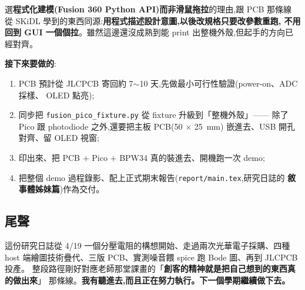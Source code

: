 \documentclass[12pt,a4paper]{article}
\begin{document}
選\textbf{程式化建模(Fusion 360 Python API)而非滑鼠拖拉}的理由,跟 PCB 那條線
從 SKiDL 學到的東西同源:\textbf{用程式描述設計意圖,以後改規格只要改參數重跑,
不用回到 GUI 一個個拉}。雖然這邊還沒成熟到能 print 出整機外殼,但起手的方向已經對齊。

\textbf{接下來要做的}:

\begin{enumerate}[leftmargin=2em,itemsep=0pt]
  \item PCB 預計從 JLCPCB 寄回約 7\(\sim\)10 天,先做最小可行性驗證(power-on、ADC 採樣、
        OLED 點亮);
  \item 同步把 \texttt{fusion\_pico\_fixture.py} 從 fixture 升級到「整機外殼」——
        除了 Pico 跟 photodiode 之外,還要把主板 PCB(50 \(\times\) \SI{25}{\milli\meter})
        嵌進去、USB 開孔對齊、留 OLED 視窗;
  \item 印出來、把 PCB \(+\) Pico \(+\) BPW34 真的裝進去、開機跑一次 demo;
  \item 把整個 demo 過程錄影、配上正式期末報告(\texttt{report/main.tex},研究日誌的
        \textbf{敘事體姊妹篇})作為交付。
\end{enumerate}

\subsection*{尾聲}

這份研究日誌從 4/19 一個分壓電阻的構想開始、走過兩次光華電子採購、四種 host
端繪圖技術疊代、三版 PCB、實測噪音餵 spice 跑 Bode 圖、再到 JLCPCB 投產。
整段路徑剛好對應老師那堂課畫的「\textbf{創客的精神就是把自己想到的東西真的做出來}」
那條線。\textbf{我有聽進去,而且正在努力執行。下一個學期繼續做下去。}

\printbibliography
\end{document}
